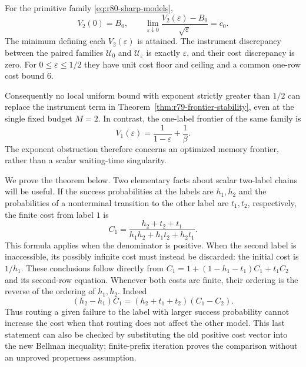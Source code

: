 \begin{theorem}
\label{thm:r80-sharp-modulus}
For the primitive family \eqref{eq:r80-sharp-models},
\begin{equation}\label{eq:r80-sharp-asymptotic}
 V_2(0)=B_0,\qquad
 \lim_{\varepsilon\downarrow0}
       \frac{V_2(\varepsilon)-B_0}{\sqrt\varepsilon}=c_0.
\end{equation}
The minimum defining each $V_2(\varepsilon)$ is attained.  The
instrument discrepancy between the paired families
$\mathcal U_0$ and $\mathcal U_\varepsilon$ is exactly
$\varepsilon$, and their cost discrepancy is zero.
For $0\le\varepsilon\le1/2$ they have unit cost floor and ceiling
and a common one-row cost bound $6$.

Consequently no local uniform bound with exponent strictly greater
than $1/2$ can replace the instrument term in
Theorem~\ref{thm:r79-frontier-stability}, even at the single fixed
budget $M=2$.  In contrast, the one-label frontier of the same
family is
\begin{equation}\label{eq:r80-one-label-smooth}
 V_1(\varepsilon)=\frac1{1-\varepsilon}+\frac1\beta.
\end{equation}
The exponent obstruction therefore concerns an optimized memory
frontier, rather than a scalar waiting-time singularity.
\end{theorem}

We prove the theorem below.  Two elementary facts about scalar
two-label chains will be useful.  If the success probabilities at
the labels are $h_1,h_2$ and the probabilities of a nonterminal
transition to the other label are $t_1,t_2$, respectively, the
finite cost from label $1$ is
\begin{equation}\label{eq:r80-two-state-cost}
 C_1=\frac{h_2+t_2+t_1}{h_1h_2+h_1t_2+h_2t_1}.
\end{equation}
This formula applies when the denominator is positive.  When the
second label is inaccessible, its possibly infinite cost must instead
be discarded: the initial cost is $1/h_1$.  These conclusions follow
directly from
$C_1=1+(1-h_1-t_1)C_1+t_1C_2$ and its second-row equation.
Whenever both costs are finite, their ordering is the reverse of
the ordering of $h_1,h_2$.  Indeed
\[
 (h_2-h_1)C_1=(h_2+t_1+t_2)(C_1-C_2).
\]
Thus routing a given failure to the label with larger success
probability cannot increase the cost when that routing does not
affect the other model.  This last statement can also be checked by
substituting the old positive cost vector into the new Bellman
inequality; finite-prefix iteration proves the comparison without
an unproved properness assumption.

